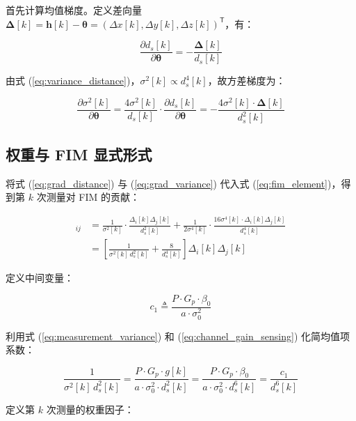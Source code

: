 首先计算均值梯度。定义差向量 $\bm{\Delta}[k]=\mathbf{h}[k]-\bm{\theta}=(\Delta x[k],\Delta y[k],\Delta z[k])^{\mathsf{T}}$，有：

\begin{equation}
\frac{\partial d_s[k]}{\partial\bm{\theta}}=-\frac{\bm{\Delta}[k]}{d_s[k]}
\label{eq:grad_distance}
\end{equation}

由式 (\ref{eq:variance_distance})，$\sigma^2[k]\propto d_s^4[k]$，故方差梯度为：

\begin{equation}
\frac{\partial\sigma^2[k]}{\partial\bm{\theta}}=\frac{4\sigma^2[k]}{d_s[k]}\cdot\frac{\partial d_s[k]}{\partial\bm{\theta}}
=-\frac{4\sigma^2[k]\cdot\bm{\Delta}[k]}{d_s^2[k]}
\label{eq:grad_variance}
\end{equation}

\subsection{权重与 FIM 显式形式}

将式 (\ref{eq:grad_distance}) 与 (\ref{eq:grad_variance}) 代入式 (\ref{eq:fim_element})，得到第 $k$ 次测量对 FIM 的贡献：

\begin{align}
[\mathbf{F}_k]_{ij}&=\frac{1}{\sigma^2[k]}\cdot\frac{\Delta_i[k]\Delta_j[k]}{d_s^2[k]}
+\frac{1}{2\sigma^4[k]}\cdot\frac{16\sigma^4[k]\cdot\Delta_i[k]\Delta_j[k]}{d_s^4[k]}\nonumber\\
&=\left[\frac{1}{\sigma^2[k]\,d_s^2[k]}+\frac{8}{d_s^4[k]}\right]\Delta_i[k]\Delta_j[k]
\label{eq:fim_k_element}
\end{align}

定义中间变量：

\begin{equation}
c_1\triangleq\frac{P\cdot G_p\cdot\beta_0}{a\cdot\sigma_0^2}
\label{eq:c1_definition}
\end{equation}

利用式 (\ref{eq:measurement_variance}) 和 (\ref{eq:channel_gain_sensing}) 化简均值项系数：

\begin{equation}
\frac{1}{\sigma^2[k]\,d_s^2[k]}=\frac{P\cdot G_p\cdot g[k]}{a\cdot\sigma_0^2\cdot d_s^2[k]}
=\frac{P\cdot G_p\cdot\beta_0}{a\cdot\sigma_0^2\cdot d_s^6[k]}=\frac{c_1}{d_s^6[k]}
\label{eq:mean_weight}
\end{equation}

定义第 $k$ 次测量的权重因子：

